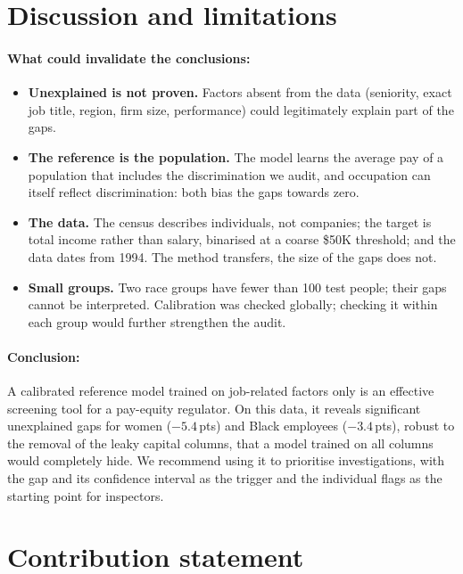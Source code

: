 \documentclass[11pt,a4paper]{article}
\newcommand{\pts}{\,pts\xspace}
\begin{document}
\section{Discussion and limitations}

\paragraph{What could invalidate the conclusions:}
\begin{itemize}
\item \textbf{Unexplained is not proven.} Factors absent from the data (seniority, exact job title, region, firm size, performance) could legitimately explain part of the gaps.
\item \textbf{The reference is the population.} The model learns the average pay of a population that includes the discrimination we audit, and occupation can itself reflect discrimination: both bias the gaps towards zero.
\item \textbf{The data.} The census describes individuals, not companies; the target is total income rather than salary, binarised at a coarse \$50K threshold; and the data dates from 1994. The method transfers, the size of the gaps does not.
\item \textbf{Small groups.} Two race groups have fewer than 100 test people; their gaps cannot be interpreted. Calibration was checked globally; checking it within each group would further strengthen the audit.
\end{itemize}

\paragraph{Conclusion:} A calibrated reference model trained on job-related factors only is an effective screening tool for a pay-equity regulator. On this data, it reveals significant unexplained gaps for women ($-5.4$\pts) and Black employees ($-3.4$\pts), robust to the removal of the leaky capital columns, that a model trained on all columns would completely hide. We recommend using it to prioritise investigations, with the gap and its confidence interval as the trigger and the individual flags as the starting point for inspectors.

\section*{Contribution statement}
\end{document}
